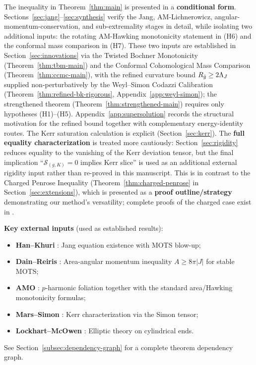 The inequality in Theorem~\ref{thm:main} is presented in a \textbf{conditional form}. Sections~\ref{sec:jang}--\ref{sec:synthesis} verify the Jang, AM-Lichnerowicz, angular-momentum-conservation, and sub-extremality stages in detail, while isolating two additional inputs: the rotating AM-Hawking monotonicity statement in (H6) and the conformal mass comparison in (H7). These two inputs are established in Section~\ref{sec:innovations} via the Twisted Bochner Monotonicity (Theorem~\ref{thm:tbm-main}) and the Conformal Cohomological Mass Comparison (Theorem~\ref{thm:ccmc-main}), with the refined curvature bound $R_{\bar{g}}\geq 2\Lambda_J$ supplied non-perturbatively by the Weyl--Simon Codazzi Calibration (Theorem~\ref{thm:refined-bk-rigorous}, Appendix~\ref{app:weyl-simon}); the strengthened theorem (Theorem~\ref{thm:strengthened-main}) requires only hypotheses (H1)--(H5). Appendix~\ref{app:supersolution} records the structural motivation for the refined bound together with complementary energy-identity routes. The Kerr saturation calculation is explicit (Section~\ref{sec:kerr}). The \textbf{full equality characterization} is treated more cautiously: Section~\ref{sec:rigidity} reduces equality to the vanishing of the Kerr deviation tensor, but the final implication ``$\mathcal{S}_{(g,K)}=0$ implies Kerr slice'' is used as an additional external rigidity input rather than re-proved in this manuscript. This is in contrast to the Charged Penrose Inequality (Theorem~\ref{thm:charged-penrose} in Section~\ref{sec:extensions}), which is presented as a \textbf{proof outline/strategy} demonstrating our method's versatility; complete proofs of the charged case exist in \cite{mars2009, khuri2015charged}.

\textbf{Key external inputs} (used as established results):
\begin{itemize}[leftmargin=1.5em, itemsep=1pt]
    \item \textbf{Han--Khuri} \cite{hankhuri2013}: Jang equation existence with MOTS blow-up;
    \item \textbf{Dain--Reiris} \cite{dain2011}: Area-angular momentum inequality $A \geq 8\pi|J|$ for stable MOTS;
    \item \textbf{AMO} \cite{amo2022}: $p$-harmonic foliation together with the standard area/Hawking monotonicity formulas;
    \item \textbf{Mars--Simon} \cite{mars1999, simon1984}: Kerr characterization via the Simon tensor;
    \item \textbf{Lockhart--McOwen} \cite{lockhartmccowen1985}: Elliptic theory on cylindrical ends.
\end{itemize}
See Section~\ref{subsec:dependency-graph} for a complete theorem dependency graph.

